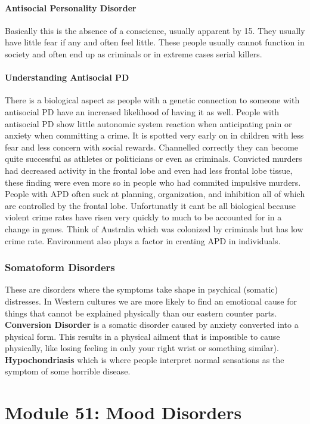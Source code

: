 \documentclass[12pt]{article}
\begin{document}
\subsection*{Antisocial Personality Disorder}
Basically this is the absence of a conscience, usually apparent by 15. They usually have little fear if any and often feel little. These people usually cannot function in society and often end up as criminals or in extreme cases serial killers.
\subsection*{Understanding Antisocial PD}
There is a biological aspect as people with a genetic connection to someone with antisocial PD have an increased likelihood of having it as well. People with antisocial PD show little autonomic system reaction when anticipating pain or anxiety when committing a crime. It is spotted very early on in children with less fear and less concern with social rewards. Channelled correctly they can become quite successful as athletes or politicians or even as criminals. Convicted murders had decreased activity in the frontal lobe and even had less frontal lobe tissue, these finding were even more so in people who had commited impulsive murders. People with APD often suck at planning, organization, and inhibition all of which are controlled by the frontal lobe. Unfortunatly it cant be all biological because violent crime rates have risen very quickly to much to be accounted for in a change in genes. Think of Australia which was colonized by criminals but has low crime rate. Environment also plays a factor in creating APD in individuals. 
\section*{Somatoform Disorders}
These are disorders where the symptoms take shape in psychical (somatic) distresses. In Western cultures we are more likely to find an emotional cause for things that cannot be explained physically than our eastern counter parts. \textbf{Conversion Disorder} is a somatic disorder caused by anxiety converted into a physical form. This results in a physical ailment that is impossible to cause physically, like losing feeling in only your right wrist or something similar). \textbf{Hypochondriasis} which is where people interpret normal sensations as the symptom of some horrible disease. 

\part*{Module 51: Mood Disorders}
\end{document}
